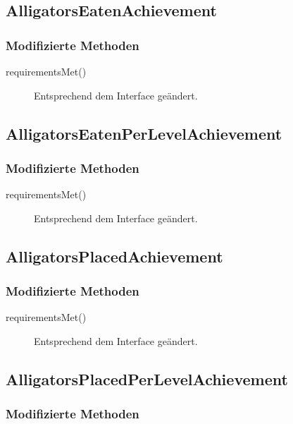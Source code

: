 \subsection{AlligatorsEatenAchievement}

\subsubsection{Modifizierte Methoden}

\begin{description}
	\item[requirementsMet()]
	Entsprechend dem Interface geändert.
\end{description}

\subsection{AlligatorsEatenPerLevelAchievement}

\subsubsection{Modifizierte Methoden}

\begin{description}
	\item[requirementsMet()]
	Entsprechend dem Interface geändert.
\end{description}

\subsection{AlligatorsPlacedAchievement}

\subsubsection{Modifizierte Methoden}

\begin{description}
	\item[requirementsMet()]
	Entsprechend dem Interface geändert.
\end{description}

\subsection{AlligatorsPlacedPerLevelAchievement}

\subsubsection{Modifizierte Methoden}

